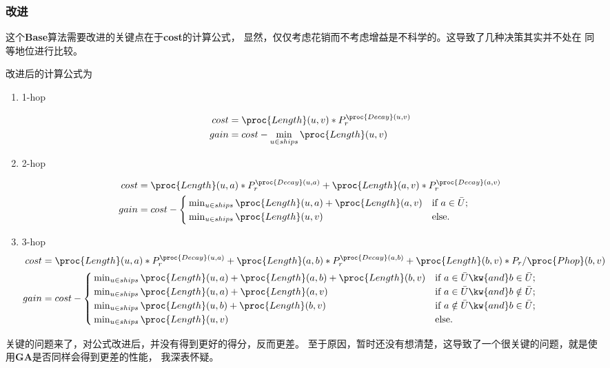 \documentclass[hyperref,UTF8]{ctexart}
\theoremstyle{definition}
\theoremstyle{remark}
\numberwithin{equation}{subsection}
\newcommand{\Emph}{\textbf}
\begin{document}
\subsubsection{改进}

	这个\Emph{Base}算法需要改进的关键点在于\Emph{cost}的计算公式，
	显然，仅仅考虑花销而不考虑增益是不科学的。这导致了几种决策其实并不处在
	同等地位进行比较。
	
	改进后的计算公式为
	\begin{enumerate}[(1)]
		
		\item 1-hop
		
		\begin{align}
			cost &= \proc{Length}(u, v) * P_r^{\proc{Decay}(u, v)}	\\
			gain &= cost - \min_{u \in ships} {\proc{Length}(u, v)}
		\end{align}
		
		\item 2-hop
		
		\begin{align}
			cost &= \proc{Length}(u, a) * P_r^{\proc{Decay}(u, a)} + \proc{Length}(a, v) * P_r^{\proc{Decay}(a, v)}	\\
			gain &= cost - \begin{cases}
				\min_{u \in ships} {\proc{Length}(u, a) + \proc{Length}(a, v)} & \text{if } a \in \bar{U};	\\
				\min_{u \in ships} {\proc{Length}(u, v)} & \text{else}.	
			\end{cases}
		\end{align}
		
		\item 3-hop
		\begin{align}
			cost &= \proc{Length}(u, a) * P_r^{\proc{Decay}(u, a)} + \proc{Length}(a, b) * P_r^{\proc{Decay}(a, b)} + \proc{Length}(b, v) * P_r / \proc{Phop}(b, v)	\\
			gain &= cost - \begin{cases}
				\min_{u \in ships} {\proc{Length}(u, a) + \proc{Length}(a, b) + \proc{Length}(b, v)} & \text{if } a \in \bar{U} \kw{ and } b \in \bar{U};	\\
				\min_{u \in ships} {\proc{Length}(u, a) + \proc{Length}(a, v)} & \text{if } a \in \bar{U} \kw{ and } b \notin \bar{U};	\\
				\min_{u \in ships} {\proc{Length}(u, b) + \proc{Length}(b, v)} & \text{if } a \notin \bar{U} \kw{ and } b \in \bar{U};	\\
				\min_{u \in ships} {\proc{Length}(u, v)} & \text{else}.
			\end{cases}
		\end{align}
		
	\end{enumerate}
	关键的问题来了，对公式改进后，并没有得到更好的得分，反而更差。
	至于原因，暂时还没有想清楚，这导致了一个很关键的问题，就是使用\Emph{GA}是否同样会得到更差的性能，
	我深表怀疑。
	
\end{document}
